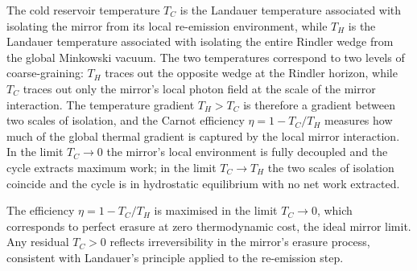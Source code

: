 The cold reservoir temperature $T_C$ is the Landauer 
temperature associated with isolating the mirror from 
its local re-emission environment, while $T_H$ is the 
Landauer temperature associated with isolating the entire 
Rindler wedge from the global Minkowski vacuum. The two 
temperatures correspond to two levels of coarse-graining: 
$T_H$ traces out the opposite wedge at the Rindler horizon, 
while $T_C$ traces out only the mirror's local photon field 
at the scale of the mirror interaction. The temperature 
gradient $T_H > T_C$ is therefore a gradient between 
two scales of isolation, and the Carnot efficiency 
$\eta = 1 - T_C/T_H$ measures how much of the global 
thermal gradient is captured by the local mirror 
interaction. In the limit $T_C \to 0$ the mirror's 
local environment is fully decoupled and the cycle 
extracts maximum work; in the limit $T_C \to T_H$ 
the two scales of isolation coincide and the cycle 
is in hydrostatic equilibrium with no net work extracted.


The efficiency $\eta = 1 - T_C/T_H$ is 
maximised in the limit $T_C \to 0$, which corresponds to 
perfect erasure at zero thermodynamic cost, the ideal 
mirror limit. Any residual $T_C > 0$ reflects irreversibility 
in the mirror's erasure process, consistent with Landauer's 
principle applied to the re-emission step.

